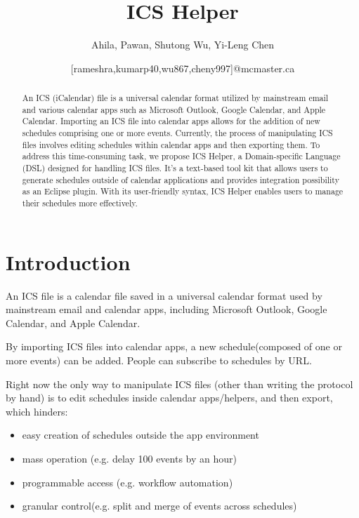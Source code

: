 \documentclass[12pt, letterpaper, twoside]{article}
\title{\textbf{ICS Helper}} %
\author{Ahila, Pawan, Shutong Wu, Yi-Leng Chen \and [rameshra,kumarp40,wu867,cheny997]@mcmaster.ca} %
\begin{document}
\maketitle

\begin{abstract}
    An ICS (iCalendar) file is a universal calendar format utilized by mainstream email and various calendar apps such as Microsoft Outlook, Google Calendar, and Apple Calendar. Importing an ICS file into calendar apps allows for the addition of new schedules comprising one or more events. Currently, the process of manipulating ICS files involves editing schedules within calendar apps and then exporting them. To address this time-consuming task, we propose ICS Helper, a Domain-specific Language (DSL) designed for handling ICS files. It's a text-based tool kit that allows users to generate schedules outside of calendar applications and provides integration possibility as an Eclipse plugin. With its user-friendly syntax, ICS Helper enables users to manage their schedules more effectively. 
\end{abstract}

\vspace{2.5cm}


\thispagestyle{firstpage}

\pagebreak

\newgeometry{} %

\section{Introduction}
\label{sec:intro}
An ICS file is a calendar file saved in a universal calendar format used by mainstream email and calendar apps, including Microsoft Outlook, Google Calendar, and Apple Calendar. 

By importing ICS files into calendar apps, a new schedule(composed of one or more events) can be added. People can subscribe to schedules by URL. 

Right now the only way to manipulate ICS files (other than writing the protocol by hand) is to edit schedules inside calendar apps/helpers, and then export, which hinders:

    \begin{itemize}
        \item easy creation of schedules outside the app environment
        \item mass operation (e.g. delay 100 events by an hour) 
        \item programmable access (e.g. workflow automation)
        \item granular control(e.g. split and merge of events across schedules)
    \end{itemize}
\end{document}
